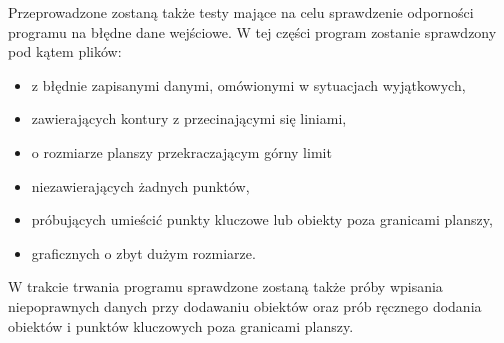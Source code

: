 \documentclass[a4paper,12pt]{article}
\begin{document}
Przeprowadzone zostaną także testy mające na celu sprawdzenie odporności programu na błędne dane wejściowe. W tej części program zostanie sprawdzony pod kątem plików:

\begin{itemize}
\item z błędnie zapisanymi danymi, omówionymi w sytuacjach wyjątkowych,
\item zawierających kontury z przecinającymi się liniami,
\item o rozmiarze planszy przekraczającym górny limit
\item niezawierających żadnych punktów,
\item próbujących umieścić punkty kluczowe lub obiekty poza granicami planszy,
\item graficznych o zbyt dużym rozmiarze.
\end{itemize}

W trakcie trwania programu sprawdzone zostaną także próby wpisania niepoprawnych danych przy dodawaniu obiektów oraz prób ręcznego dodania obiektów i punktów kluczowych poza granicami planszy.
\end{document}
